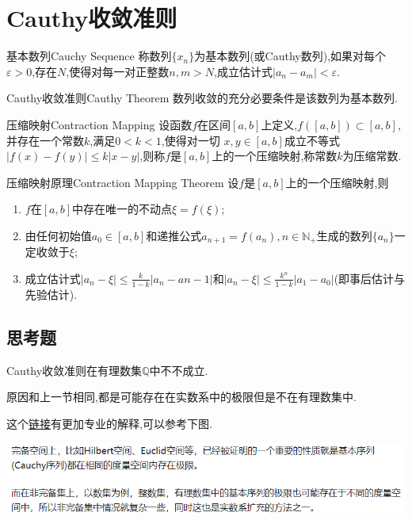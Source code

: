 \documentclass[cn,chinese,fontset]{elegantbook}
\begin{document}
 \section{Cauthy收敛准则}

  \begin{definition}{基本数列}{Cauchy Sequence}
      称数列$\{x_n\}$为基本数列(或Cauthy数列),如果对每个$\varepsilon>0$,存在$N$,使得对每一对正整数$n,m>N$,成立估计式$\lvert a_n-a_m\rvert<\varepsilon$.
  \end{definition}

  \begin{theorem}{Cauthy收敛准则}{Cauthy Theorem}
      数列收敛的充分必要条件是该数列为基本数列.
  \end{theorem}

  \begin{definition}{压缩映射}{Contraction Mapping}
      设函数$f$在区间$[a,b]$上定义,$f([a,b])\subset [a,b]$,并存在一个常数$k$,满足$0<k<1$,使得对一切 $x,y\in [a,b]$成立不等式$\lvert f(x)-f(y)\rvert\leqslant k\lvert x-y\rvert$,则称$f$是$[a,b]$上的一个压缩映射,称常数$k$为压缩常数.
  \end{definition}
  \begin{theorem}{压缩映射原理}{Contraction Mapping Theorem}
      设$f$是$[a,b]$上的一个压缩映射,则
      \begin{enumerate}
          \item $f$在$[a,b]$中存在唯一的不动点$\xi=f(\xi)$;\item 由任何初始值$a_0\in[a,b]$和递推公式$a_{n+1}=f(a_n),n\in \mathbb{N}_+$生成的数列$\{a_n\}$一定收敛于$\xi$;\item 成立估计式$\lvert a_n-\xi\rvert\leqslant\frac{k}{1-k}\lvert a_n-a{n-1}\rvert$和$\lvert a_n-\xi\rvert\leqslant\frac{k^n}{1-k}\lvert a_1-a_0\rvert$(即事后估计与先验估计).
      \end{enumerate}
  \end{theorem}
  \subsection{思考题}
      \begin{example}
          Cauthy收敛准则在有理数集$\mathbb{Q}$中不不成立.
      \end{example}
      \begin{solution}
          原因和上一节相同,都是可能存在在实数系中的极限但是不在有理数集中.

          这个\href{https://www.zhihu.com/question/50995932/answer/866173110}{链接}有更加专业的解释,可以参考下图.

          \includegraphics[width=0.8\linewidth]{第三章 实数系的基本定理/3.4 Cauthy收敛准则/Cauthy收敛准则在Q中不成立.png}
      \end{solution}
\end{document}
